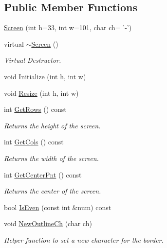\subsection*{Public Member Functions}
\begin{DoxyCompactItemize}
\item 
\hyperlink{classScreen_a932b81c3d221d644cc40ffe9003515a5}{Screen} (int h=33, int w=101, char ch= '-\/')
\item 
virtual \hyperlink{classScreen_a4243bc17596af96415b09ac48205676d}{$\sim$\-Screen} ()
\begin{DoxyCompactList}\small\item\em Virtual Destructor. \end{DoxyCompactList}\item 
void \hyperlink{classScreen_a455b38b1ac9b18bd67ecd2e056dff909}{Initialize} (int h, int w)
\item 
void \hyperlink{classScreen_a11f9842c836301989f7c3d84eb043700}{Resize} (int h, int w)
\item 
int \hyperlink{classScreen_aa12cc4ea36f5d2ac98b3c7334616acbc}{Get\-Rows} () const 
\begin{DoxyCompactList}\small\item\em Returns the height of the screen. \end{DoxyCompactList}\item 
int \hyperlink{classScreen_a223cd8821b2b8006c61545ff41aa0091}{Get\-Cols} () const 
\begin{DoxyCompactList}\small\item\em Returns the width of the screen. \end{DoxyCompactList}\item 
int \hyperlink{classScreen_a95daa612c5ec6a8018b89cfc2d785e27}{Get\-Center\-Pnt} () const 
\begin{DoxyCompactList}\small\item\em Returns the center of the screen. \end{DoxyCompactList}\item 
bool \hyperlink{classScreen_af7a18ec4e53fb371293e9ebcc23b7e2b}{Is\-Even} (const int \&num) const 
\item 
void \hyperlink{classScreen_a27dcfac6e64ab72059d0801dd9714d7a}{New\-Outline\-Ch} (char ch)
\begin{DoxyCompactList}\small\item\em Helper function to set a new character for the border. \end{DoxyCompactList}\item 

\end{DoxyCompactItemize}
